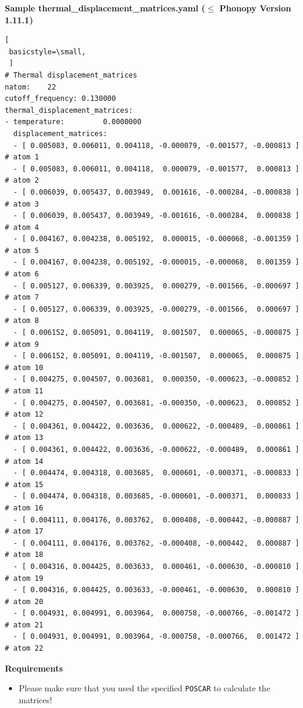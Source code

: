 \documentclass[12pt,a4paper]{article}
\begin{document}
 
 \newpage
\textbf{Sample thermal\_displacement\_matrices.yaml ($\mathbf{\leq}$ Phonopy Version 1.11.1)}
 \begin{lstlisting}[
 basicstyle=\small,
 ]
# Thermal displacement_matrices
natom:    22
cutoff_frequency: 0.130000
thermal_displacement_matrices:
- temperature:         0.0000000
  displacement_matrices:
  - [ 0.005083, 0.006011, 0.004118, -0.000079, -0.001577, -0.000813 ] # atom 1
  - [ 0.005083, 0.006011, 0.004118,  0.000079, -0.001577,  0.000813 ] # atom 2
  - [ 0.006039, 0.005437, 0.003949,  0.001616, -0.000284, -0.000838 ] # atom 3
  - [ 0.006039, 0.005437, 0.003949, -0.001616, -0.000284,  0.000838 ] # atom 4
  - [ 0.004167, 0.004238, 0.005192,  0.000015, -0.000068, -0.001359 ] # atom 5
  - [ 0.004167, 0.004238, 0.005192, -0.000015, -0.000068,  0.001359 ] # atom 6
  - [ 0.005127, 0.006339, 0.003925,  0.000279, -0.001566, -0.000697 ] # atom 7
  - [ 0.005127, 0.006339, 0.003925, -0.000279, -0.001566,  0.000697 ] # atom 8
  - [ 0.006152, 0.005091, 0.004119,  0.001507,  0.000065, -0.000875 ] # atom 9
  - [ 0.006152, 0.005091, 0.004119, -0.001507,  0.000065,  0.000875 ] # atom 10
  - [ 0.004275, 0.004507, 0.003681,  0.000350, -0.000623, -0.000852 ] # atom 11
  - [ 0.004275, 0.004507, 0.003681, -0.000350, -0.000623,  0.000852 ] # atom 12
  - [ 0.004361, 0.004422, 0.003636,  0.000622, -0.000489, -0.000861 ] # atom 13
  - [ 0.004361, 0.004422, 0.003636, -0.000622, -0.000489,  0.000861 ] # atom 14
  - [ 0.004474, 0.004318, 0.003685,  0.000601, -0.000371, -0.000833 ] # atom 15
  - [ 0.004474, 0.004318, 0.003685, -0.000601, -0.000371,  0.000833 ] # atom 16
  - [ 0.004111, 0.004176, 0.003762,  0.000408, -0.000442, -0.000887 ] # atom 17
  - [ 0.004111, 0.004176, 0.003762, -0.000408, -0.000442,  0.000887 ] # atom 18
  - [ 0.004316, 0.004425, 0.003633,  0.000461, -0.000630, -0.000810 ] # atom 19
  - [ 0.004316, 0.004425, 0.003633, -0.000461, -0.000630,  0.000810 ] # atom 20
  - [ 0.004931, 0.004991, 0.003964,  0.000758, -0.000766, -0.001472 ] # atom 21
  - [ 0.004931, 0.004991, 0.003964, -0.000758, -0.000766,  0.001472 ] # atom 22
 \end{lstlisting}
 
\textbf{Requirements}
\begin{itemize}
 \item Please make sure that you used the specified \texttt{POSCAR} to calculate the matrices!
\end{itemize}

 \newpage
\end{document}
